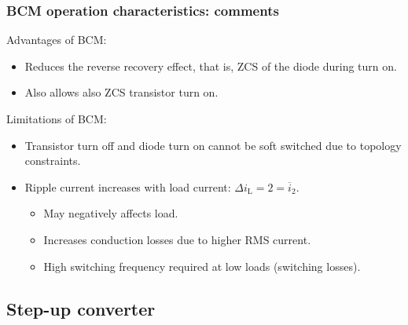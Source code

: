 \begin{frame}
    \frametitle{BCM operation characteristics: comments}
   Advantages of BCM:
   \begin{itemize}
        \item Reduces the reverse recovery effect, that is, ZCS of the diode during turn on.
        \item Also allows also ZCS transistor turn on.  
   \end{itemize}
   \vspace{1em}
   Limitations of BCM:
    \begin{itemize}
          \item Transistor turn off and diode turn on cannot be soft switched due to topology constraints.
          \item Ripple current increases with load current: $ \Delta i_\mathrm{L} = 2=\overline{i}_2$.
          \begin{itemize}
            \item May negatively affects load.
            \item Increases conduction losses due to higher RMS current.
            \item High switching frequency required at low loads (switching losses).
          \end{itemize}
    \end{itemize}
\end{frame}

\subsection{Step-up converter}


